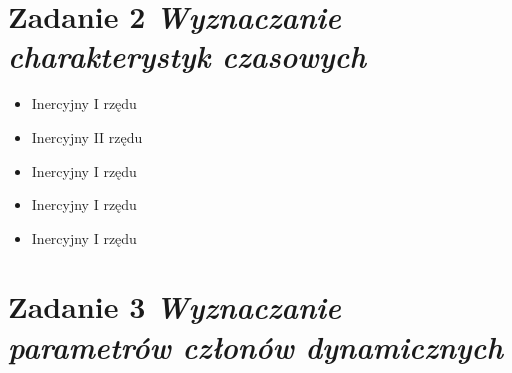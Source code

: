 \documentclass[a4paper,10pt]{article}
\begin{document}
\section{Zadanie 2 \textit{\small Wyznaczanie charakterystyk czasowych}}\label{sec:zad2}

\begin{itemize}
\item Inercyjny I rzędu
\item Inercyjny II rzędu

\item Inercyjny I rzędu
\item Inercyjny I rzędu
\item Inercyjny I rzędu
\end{itemize}

\section{Zadanie 3 \textit{\small Wyznaczanie parametrów członów dynamicznych}}\label{sec:zad3}
\end{document}
